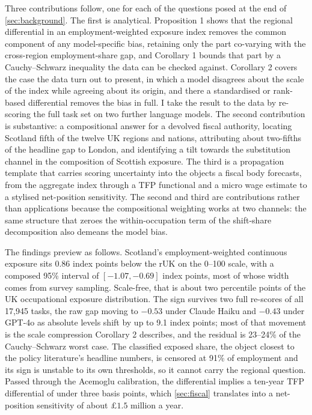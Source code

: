 Three contributions follow, one for each of the questions posed at the end of \cref{sec:background}. The first is analytical. Proposition 1 shows that the regional differential in an employment-weighted exposure index removes the common component of any model-specific bias, retaining only the part co-varying with the cross-region employment-share gap, and Corollary 1 bounds that part by a Cauchy--Schwarz inequality the data can be checked against. Corollary 2 covers the case the data turn out to present, in which a model disagrees about the scale of the index while agreeing about its origin, and there a standardised or rank-based differential removes the bias in full. I take the result to the data by re-scoring the full task set on two further language models. The second contribution is substantive: a compositional answer for a devolved fiscal authority, locating Scotland fifth of the twelve UK regions and nations, attributing about two-fifths of the headline gap to London, and identifying a tilt towards the substitution channel in the composition of Scottish exposure. The third is a propagation template that carries scoring uncertainty into the objects a fiscal body forecasts, from the aggregate index through a TFP functional and a micro wage estimate to a stylised net-position sensitivity. The second and third are contributions rather than applications because the compositional weighting works at two channels: the same structure that zeroes the within-occupation term of the shift-share decomposition also demeans the model bias. 


The findings preview as follows. Scotland's employment-weighted continuous exposure sits 0.86 index points below the rUK on the 0--100 scale, with a composed 95\% interval of $[-1.07, -0.69]$ index points, most of whose width comes from survey sampling. Scale-free, that is about two percentile points of the UK occupational exposure distribution. The sign survives two full re-scores of all 17,945 tasks, the raw gap moving to $-0.53$ under Claude Haiku and $-0.43$ under GPT-4o as absolute levels shift by up to 9.1 index points; most of that movement is the scale compression Corollary 2 describes, and the residual is 23--24\% of the Cauchy--Schwarz worst case. The classified exposed share, the object closest to the policy literature's headline numbers, is censored at 91\% of employment and its sign is unstable to its own thresholds, so it cannot carry the regional question. Passed through the Acemoglu calibration, the differential implies a ten-year TFP differential of under three basis points, which \cref{sec:fiscal} translates into a net-position sensitivity of about $£1.5$ million a year.

